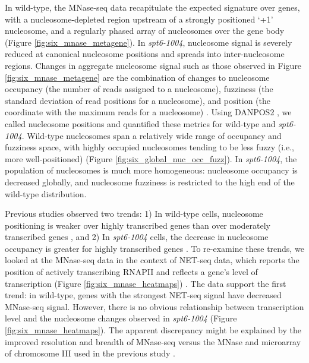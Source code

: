 In wild-type, the MNase-seq data recapitulate the expected signature over genes, with a nucleosome-depleted region upstream of a strongly positioned `+1' nucleosome, and a regularly phased array of nucleosomes over the gene body (Figure \ref{fig:six_mnase_metagene}).
In \textit{spt6-1004}, nucleosome signal is severely reduced at canonical nucleosome positions and spreads into inter-nucleosome regions.
Changes in aggregate nucleosome signal such as those observed in Figure \ref{fig:six_mnase_metagene} are the combination of changes to nucleosome occupancy (the number of reads assigned to a nucleosome), fuzziness (the standard deviation of read positions for a nucleosome), and position (the coordinate with the maximum reads for a nucleosome) \citep{chen2013}.
Using DANPOS2 \citep{chen2013}, we called nucleosome positions and quantified these metrics for wild-type and \textit{spt6-1004}.
Wild-type nucleosomes span a relatively wide range of occupancy and fuzziness space, with highly occupied nucleosomes tending to be less fuzzy (i.e., more well-positioned) (Figure \ref{fig:six_global_nuc_occ_fuzz}).
In \textit{spt6-1004}, the population of nucleosomes is much more homogeneous: nucleosome occupancy is decreased globally, and nucleosome fuzziness is restricted to the high end of the wild-type distribution.

Previous studies observed two trends: 1) In wild-type cells, nucleosome positioning is weaker over highly transcribed genes than over moderately transcribed genes \citep{shivaswamy2008}, and 2) In \textit{spt6-1004} cells, the decrease in nucleosome occupancy is greater for highly transcribed genes \citep{ivanovska2011}.
To re-examine these trends, we looked at the MNase-seq data in the context of NET-seq data, which reports the position of actively transcribing RNAPII and reflects a gene's level of transcription (Figure \ref{fig:six_mnase_heatmaps}) \citep{churchman2012}.
The data support the first trend: in wild-type, genes with the strongest NET-seq signal have decreased MNase-seq signal.
However, there is no obvious relationship between transcription level and the nucleosome changes observed in \textit{spt6-1004} (Figure \ref{fig:six_mnase_heatmaps}).
The apparent discrepancy might be explained by the improved resolution and breadth of MNase-seq versus the MNase and microarray of chromosome III used in the previous study \citep{ivanovska2011}.

